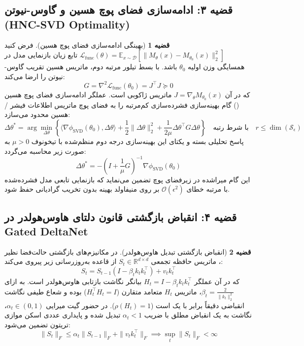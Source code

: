 \documentclass[12pt,a4paper]{report}
\theoremstyle{definition}
\newtheorem{theorem}{قضیه}[chapter]
\begin{document}
\subsection{قضیه ۳: ادامه‌سازی فضای پوچ هسین و گاوس-نیوتن (HNC-SVD Optimality)}
\begin{theorem}[بهینگی ادامه‌سازی فضای پوچ هسین]
\label{thm:hnc_optimality}
فرض کنید $\mathcal{L}_{\text{func}}(\theta) = \mathbb{E}_{x \sim \mathcal{D}} [ \| M_\theta(x) - M_{\theta_0}(x) \|_2^2 ]$ تابع زیان بازنمایی مدل در همسایگی وزن اولیه $\theta_0$ باشد. با بسط تیلور مرتبه دوم، ماتریس هسین تقریب گاوس-نیوتن را ارضا می‌کند:
\begin{equation}
G = \nabla^2 \mathcal{L}_{\text{func}}(\theta_0) = J^\top J \succeq 0
\end{equation}
که در آن $J = \nabla_\theta M_{\theta_0}(x)$ ماتریس ژاکوبی است. عملگر ادامه‌سازی فضای پوچ هسین () گام بهینه‌سازی فشرده‌سازی کم‌مرتبه را به فضای پوچ ماتریس اطلاعات فیشر / هسین محدود می‌سازد:
\begin{equation}
\Delta \theta^* = \arg\min_{\Delta \theta} \left\{ \langle \nabla \phi_{\text{SVD}}(\theta_0), \Delta \theta \rangle + \frac{1}{2} \|\Delta \theta\|_2^2 + \frac{1}{2\mu} \Delta \theta^\top G \Delta \theta \right\} \quad \text{با شرط رتبه} \quad r \le \operatorname{dim}(\mathcal{S}_\epsilon)
\end{equation}
پاسخ تحلیلی بسته و یکتای این بهینه‌سازی درجه دوم منظم‌شده با تیخونوف $\mu > 0$ به صورت زیر محاسبه می‌گردد:
\begin{equation}
\Delta \theta^* = -\left( I + \frac{1}{\mu} G \right)^{-1} \nabla \phi_{\text{SVD}}(\theta_0)
\end{equation}
این گام میراشده در زیرفضای پوچ تضمین می‌نماید که بازنمایی تابعی مدل فشرده‌شده با مرتبه خطای $\mathcal{O}(\epsilon^2)$ بر روی منیفاولد بهینه بدون تخریب گرادیانی حفظ شود.
\end{theorem}

\subsection{قضیه ۴: انقباض بازگشتی قانون دلتای هاوس‌هولدر در Gated DeltaNet}
\begin{theorem}[انقباض بازگشتی تبدیل هاوس‌هولدر]
\label{thm:deltanet_contraction}
در مکانیزم‌های بازگشتی حالت‌فضا نظیر ، ماتریس حافظه تجمعی $S_t \in \mathbb{R}^{d \times d}$ از قاعده به‌روزرسانی زیر پیروی می‌کند:
\begin{equation}
S_t = S_{t-1} \left( I - \beta_t k_t k_t^\top \right) + v_t k_t^\top
\end{equation}
که در آن عملگر $H_t = I - \beta_t k_t k_t^\top$ بیانگر نگاشت بازتابی هاوس‌هولدر است. به ازای $\beta_t = \frac{2}{\|k_t\|_2^2}$، ماتریس $H_t$ متعامد متقارن ($H_t^\top H_t = I$) بوده و شعاع طیفی نگاشت انقباضی دقیقاً برابر با یک است ($\rho(H_t) = 1$). در حضور گیت میرایی $\alpha_t \in (0, 1)$، نگاشت به یک انقباض مطلق با ضریب $\alpha_t < 1$ تبدیل شده و پایداری عددی اسکن موازی تریتون تضمین می‌شود:
\begin{equation}
\| S_t \|_F \le \alpha_t \| S_{t-1} \|_F + \| v_t k_t^\top \|_F \implies \sup_t \|S_t\|_F < \infty
\end{equation}
\end{theorem}
\end{document}
